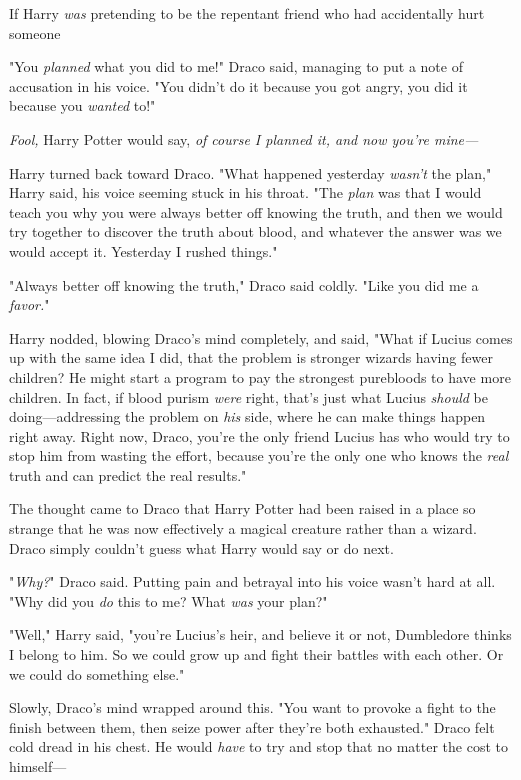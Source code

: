 If Harry \emph{was} pretending to be the repentant friend who had accidentally
hurt someone{\el}

"You \emph{planned} what you did to me!" Draco said, managing to put a note of
accusation in his voice. "You didn't do it because you got angry, you did it
because you \emph{wanted} to!"

\emph{Fool,} Harry Potter would say, \emph{of course I planned it, and now
you're mine---}

Harry turned back toward Draco. "What happened yesterday \emph{wasn't} the
plan," Harry said, his voice seeming stuck in his throat. "The \emph{plan} was
that I would teach you why you were always better off knowing the truth, and
then we would try together to discover the truth about blood, and whatever the
answer was we would accept it. Yesterday I{\el} rushed things."

"Always better off knowing the truth," Draco said coldly. "Like you did me a
\emph{favor.}"

Harry nodded, blowing Draco's mind completely, and said, "What if Lucius comes
up with the same idea I did, that the problem is stronger wizards having fewer
children? He might start a program to pay the strongest purebloods to have more
children. In fact, if blood purism \emph{were} right, that's just what Lucius
\emph{should} be doing---addressing the problem on \emph{his} side, where he
can make things happen right away. Right now, Draco, you're the only friend
Lucius has who would try to stop him from wasting the effort, because you're
the only one who knows the \emph{real} truth and can predict the real results."

The thought came to Draco that Harry Potter had been raised in a place so
strange that he was now effectively a magical creature rather than a wizard.
Draco simply couldn't guess what Harry would say or do next.

"\emph{Why?}" Draco said. Putting pain and betrayal into his voice wasn't hard
at all. "Why did you \emph{do} this to me? What \emph{was} your plan?"

"Well," Harry said, "you're Lucius's heir, and believe it or not, Dumbledore
thinks I belong to him. So we could grow up and fight their battles with each
other. Or we could do something else."

Slowly, Draco's mind wrapped around this. "You want to provoke a fight to the
finish between them, then seize power after they're both exhausted." Draco felt
cold dread in his chest. He would \emph{have} to try and stop that no matter
the cost to himself\mbox{---}


